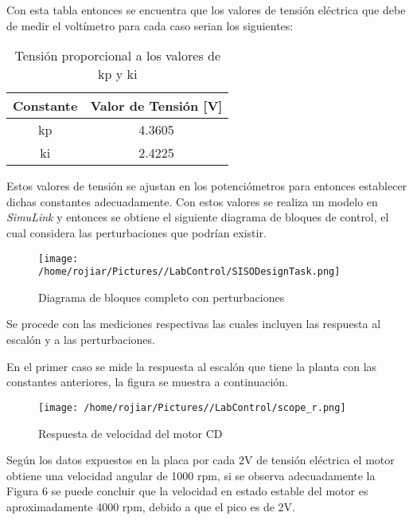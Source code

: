 \documentclass[a4paper,10pt,twocolumn]{article}
\begin{document}
Con esta tabla entonces se encuentra que los valores de tensión eléctrica que debe de medir el voltímetro para cada caso serian los siguientes:\\

\begin{table}[h]
\caption{Tensión proporcional a los valores de kp y ki}
\centering
\begin{tabular}{c | c}
\hline
  Constante & Valor de Tensión [V] \\
  \hline
  kp & 4.3605 \\
  \hline
  ki & 2.4225 \\
  \hline
\end{tabular}
\label{Relacion existente entre los potenciometros de ajuste y la tension medida en el multimetro}
\end{table}

Estos valores de tensión se ajustan en los potenciómetros para entonces establecer dichas constantes adecuadamente. Con estos valores
se realiza un modelo en \textit{SimuLink} y entonces se obtiene el siguiente diagrama de bloques de control, el cual considera las perturbaciones
que podrían existir.

\begin{figure}[h]
\centering
\texttt{[image: /home/rojiar/Pictures//LabControl/SISODesignTask.png]}
\caption{Diagrama de bloques completo con perturbaciones}
\label{Diagrama de bloques completo con perturbaciones}
\end{figure}

Se procede con las mediciones respectivas las cuales incluyen las respuesta al escalón y a las perturbaciones.

En el primer caso se mide la respuesta al escalón que tiene la planta con las constantes anteriores, la figura se muestra a continuación. \\

\begin{figure}[h]
\centering
\texttt{[image: /home/rojiar/Pictures//LabControl/scope\_r.png]}
\caption{Respuesta de velocidad del motor CD}
\label{Respuesta de velocidad del motor CD}
\end{figure}

Según los datos expuestos en la placa por cada 2V de tensión eléctrica el motor obtiene una velocidad angular de 1000 rpm, si se observa
adecuadamente la Figura 6  se puede concluir que la velocidad en estado estable del motor es aproximadamente 4000 rpm, debido a que el pico
es de 2V.\\
\end{document}
